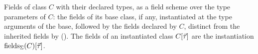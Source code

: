 Fields of class $C$ with their declared types, as a field scheme over the type parameters of $C$: the fields of
its base class, if any, instantiated at the type arguments of the base, followed by the fields declared by $C$, distinct
from the inherited fields by  (). The fields of an instantiated class
$C[\seq{\tau}]$ are the instantiation $\tyInst{\fields{\Sigma}(C)}{\seq{\tau}}$.
